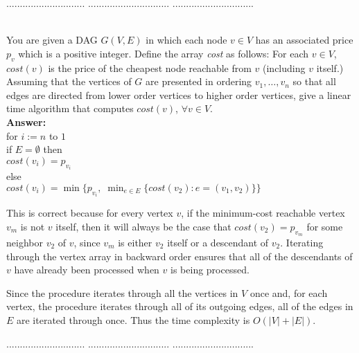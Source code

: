\documentclass[a4paper,11pt]{article}
\begin{document}
\pagebreak
{} $.............................$
 $..............................$
          $..............................$\\

\bigskip
{}\\
You are given a DAG $G(V,E)$ in which each node $v\in V$ has an associated price $p_v$ which is a
positive integer. Define the array \textit{cost} as follows: For each $v \in V$, 
$cost(v)$ is the price of the cheapest node reachable from $v$ (including $v$ itself.) 
Assuming that the vertices of $G$ are presented in ordering $v_1 , \ldots , v_n$ 
so that all edges are directed from lower order vertices to higher order vertices, 
give a linear time algorithm that computes $cost(v)$, $\forall v \in V$.\\
{\bf Answer:}\\
for $i := n$ to $1$ \\
\indent if $E = \emptyset$ then \\
\indent \indent $cost(v_i) = p_{v_i}$ \\
\indent else \\
\indent \indent $cost(v_i) = \min\{p_{v_i}, \; \min_{e \in E} \{ cost(v_2) : e = (v_1, v_2) \} \}$ \par
This is correct because for every vertex $v$, if the minimum-cost reachable vertex $v_m$ is not $v$ itself, then it will always be the case that $cost(v_2) = p_{v_m}$ for some neighbor $v_2$ of $v$, since $v_m$ is either $v_2$ itself or a descendant of $v_2$. Iterating through the vertex array in backward order ensures that all of the descendants of $v$ have already been processed when $v$ is being processed. \par
Since the procedure iterates through all the vertices in $V$ once and, for each vertex, the procedure iterates through all of its outgoing edges, all of the edges in $E$ are iterated through once. Thus the time complexity is $O(|V| + |E|)$.

\pagebreak
{} $.............................$
 $..............................$
          $..............................$\\
\end{document}
